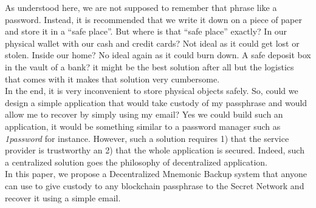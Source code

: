 \documentclass[12pt]{article}
\begin{document}
As understood here, we are not supposed to remember that phrase like a password. Instead, it is recommended that we write it down on a piece of paper and store it in a ``safe place''. But where is that ``safe place'' exactly? In our physical wallet with our cash and credit cards? Not ideal as it could get lost or stolen. Inside our home? No ideal again as it could burn down. A safe deposit box in the vault of a bank? it might be the best solution after all but the logistics that comes with it makes that solution very cumbersome. \\
 
In the end, it is very inconvenient to store physical objects safely. So, could we design a simple application that would take custody of my passphrase and would allow me to recover by simply using my email? Yes we could build such an application, it would be something similar to a password manager such as {\em 1password} \cite{1password} for instance. However, such a solution requires 1) that the service provider is trustworthy an 2) that the whole application is secured. Indeed, such a centralized solution goes the philosophy of decentralized application. \\

In this paper, we propose a Decentralized Mnemonic Backup system that anyone can use to give custody to any blockchain passphrase to the Secret Network \cite{SecretNetwork} and recover it using a simple email.  

%
%
%
%
%
%
\end{document}

